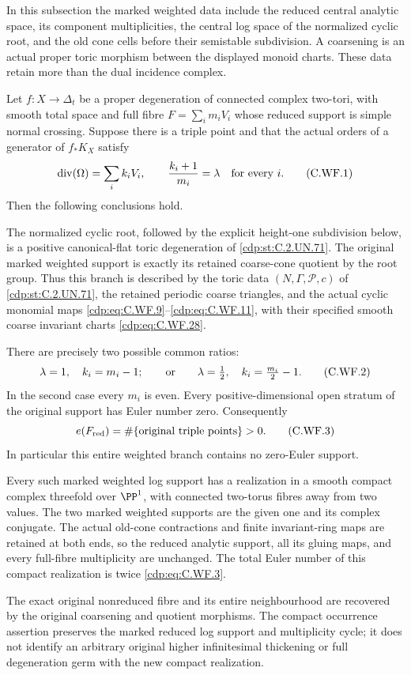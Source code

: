 
In this subsection the marked weighted data include the reduced
central analytic space, its component multiplicities, the central
log space of the normalized cyclic root, and the old cone cells
before their semistable subdivision.  A coarsening is an actual
proper toric morphism between the displayed monoid charts.  These
data retain more than the dual incidence complex.

\begin{proposition}\label{cdp:st:C.2.UN.76}
Let \(f:X\to\Delta_t\) be a proper degeneration of connected complex
two-tori, with smooth total space and full fibre
\(F=\sum_i m_iV_i\) whose reduced support is simple normal crossing.
Suppose there is a triple point and that the actual orders of a
generator of \(f_*K_X\) satisfy
\[
 \operatorname{div}(\Omega)=\sum_i k_iV_i,\qquad
 \frac{k_i+1}{m_i}=\lambda\quad\hbox{for every }i.
\tag{C.WF.1}\label{cdp:eq:C.WF.1}
\]
Then the following conclusions hold.

The normalized cyclic root, followed by the explicit height-one
subdivision below, is a positive canonical-flat toric degeneration
of \ref{cdp:st:C.2.UN.71}.  The original marked weighted support is exactly its
retained coarse-cone quotient by the root group.  Thus this branch
is described by the toric data \((N,\Gamma,\mathscr P,c)\) of \ref{cdp:st:C.2.UN.71},
the retained periodic coarse triangles, and the actual cyclic
monomial maps \eqref{cdp:eq:C.WF.9}--\eqref{cdp:eq:C.WF.11}, with their specified smooth
coarse invariant charts \eqref{cdp:eq:C.WF.28}.

There are precisely two possible common ratios:
\[
 \lambda=1,\quad k_i=m_i-1;
 \qquad\hbox{or}\qquad
 \lambda=\tfrac12,\quad k_i=\tfrac{m_i}{2}-1.
\tag{C.WF.2}\label{cdp:eq:C.WF.2}
\]
In the second case every \(m_i\) is even.  Every positive-dimensional
open stratum of the original support has Euler number zero.
Consequently
\[
             e(F_{\mathrm{red}})
               =\#\{\hbox{original triple points}\}>0.
\tag{C.WF.3}\label{cdp:eq:C.WF.3}
\]
In particular this entire weighted branch contains no zero-Euler
support.

Every such marked weighted log support has a realization in a
smooth compact complex threefold over \(\PP^1\), with connected
two-torus fibres away from two values.  The two marked weighted
supports are the given one and its complex conjugate.  The actual
old-cone contractions and finite invariant-ring maps are retained
at both ends, so the reduced analytic support, all its gluing maps,
and every full-fibre multiplicity are unchanged.  The total Euler
number of this compact realization is twice \eqref{cdp:eq:C.WF.3}.

The exact original nonreduced fibre and its entire neighbourhood
are recovered by the original coarsening and quotient morphisms.
The compact occurrence assertion preserves the marked reduced
log support and multiplicity cycle; it does not identify an
arbitrary original higher infinitesimal thickening or full
degeneration germ with the new compact realization.
\end{proposition}

